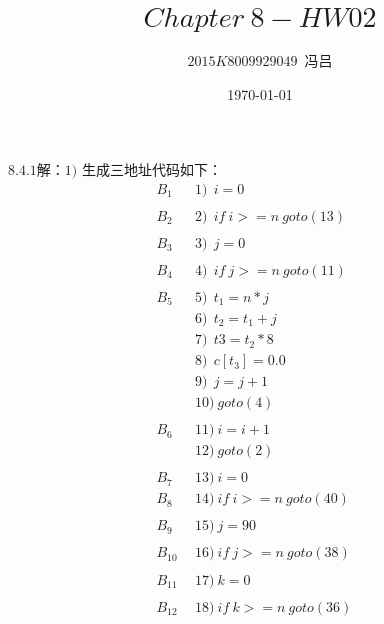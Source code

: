\documentclass[UTF8,noindent]{ctexart}
\title{$Chapter\ 8 -HW02$}
\author{$2015K8009929049$\ 冯吕}
\date{\today}
\begin{document}
\maketitle
{}
$8.4.1$解：$1)$ 生成三地址代码如下：
\begin{align*}
B_1\ \    &1)\ \ i = 0\\
&\\
B_2\ \ &2)\ \ if \ i >=n\ goto(13)\\
&\\
B_3 \ \ &3)\ \ j = 0\\
&\\
B_4\ \ &4)\ \ if\ j >= n\ goto(11)\\
&\\
B_5\ \ &5)\ \ t_1 = n*j\\
&6)\ \ t_2 = t_1+j\\
&7)\ \  t3 = t_2*8\\
&8)\ \ c[t_3] = 0.0\\
&9)\ \ j = j+1\\
&10) \ goto(4)\\
&\\
B_6\ \ &11)\ i = i +1\\
&12)\ goto(2)\\
&\\
B_7\ \ &13) \ i = 0
&\\
B_8\ \ &14)\ if \ i >= n\ goto(40)\\
&\\
B_9\ \ &15)\ j = 90\\
&\\
B_{10}\ \ &16)\ if \ j >= n\ goto(38)\\
&\\
B_{11}\ \ &17)\ k = 0\\
&\\
B_{12}\ \ &18)\ if \ k >= n\ goto(36)\\
\end{align*}
\end{document}
